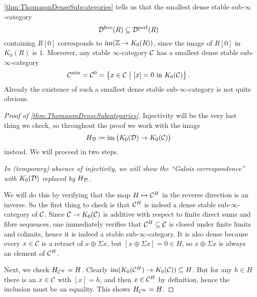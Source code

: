 \documentclass[a4paper, 10pt, oneside, DIV=9, chapterprefix=true, numbers=enddot,bibliography=totoc]{scrbook}
\newcommand{\embrace}[1]{\textup{(}#1\textup{)}}
\begin{document}
\label{exm:Minimalisation}
\cref{thm:ThomasonDenseSubcategories} tells us that the smallest dense stable sub-$\infty$-category
\begin{equation*}
	\mathcal{D}^\mathrm{free}(R)\subseteq \mathcal{D}^{\mathrm{perf}}(R)
\end{equation*}
containing $R[0]$ corresponds to $\im(\IZ\morphism K_0(R))$, since the image of $R[0]$ in $K_0(R)$ is $1$. Moreover, any stable $\infty$-category $\mathcal{C}$ has a smallest dense stable sub-$\infty$-category
\begin{equation*}
	\Cc^{\min}=\Cc^0=\big\{x\in\Cc\ \big|\ [x]=0\text{ in }K_0(\Cc)\big\}\,.
\end{equation*}
Already the existence of such a smallest dense stable sub-$\infty$-category is not quite obvious.
\begin{proof}[Proof of \cref{thm:ThomasonDenseSubcategories}]
	Injectivity will be the very last thing we check, so throughout the proof we work with the image
	\begin{equation*}
		H_{\mathcal{D}}\coloneqq\operatorname{im}\big(K_0(\mathcal{D})\rightarrow K_0(\mathcal{C})\big) 
	\end{equation*}
	instead. We will proceed in two steps.
	\begin{alphanumerate}
		\item[\itememph{1}] \itshape In \embrace{temporary} absence of injectivity, we will show the \enquote{Galois correspondence} with $K_0(\mathcal{D})$ replaced by $H_{\mathcal{D}}$.
	\end{alphanumerate}
	
	We will do this by verifying that the map $H\mapsto \mathcal{C}^H$ in the reverse direction is an inverse. So the first thing to check is that $\mathcal{C}^H$ is indeed a dense stable sub-$\infty$-category of $\mathcal{C}$. Since $\Cc\morphism K_0(\Cc)$ is additive with respect to finite direct sums and fibre sequences, one immediately verifies that $\mathcal{C}^H\subseteq \mathcal{C}$ is closed under finite limits and colimits, hence it is indeed a stable sub-$\infty$-category. It is also dense because every $x\in \mathcal{C}$ is a retract of $x\oplus \Sigma x$, but $[x\oplus \Sigma x]=0\in H$, so $x\oplus \Sigma x$ is always an element of $\mathcal{C}^H$.
	
	Next, we check $H_{\mathcal{C}^H}=H$. Clearly $\im(K_0(\Cc^H)\morphism K_0(\Cc))\subseteq H$. But for any $h\in H$ there is an $x\in \mathcal{C}$ with $[x]=h$, and then $x\in \mathcal{C}^H$ by definition, hence the inclusion must be an equality. This shows $H_{\mathcal{C}^H}=H$.
	

\end{proof}
\end{document}
